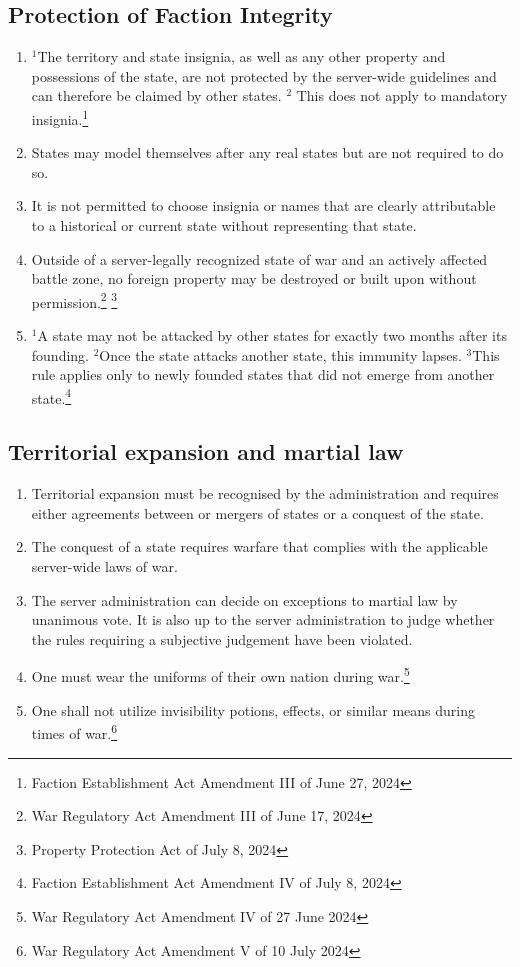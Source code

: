 \documentclass{article}
\begin{document}
\subsection{Protection of Faction Integrity}
\begin{enumerate}[(1)]
	\item ${^1}$The territory and state insignia, as well as any other property and possessions of the state, are not protected by the server-wide guidelines and can therefore be claimed by other states. ${^2}$ This does not apply to mandatory insignia.\footnote{Faction Establishment Act Amendment III of June 27, 2024}
    \item States may model themselves after any real states but are not required to do so.
    \item It is not permitted to choose insignia or names that are clearly attributable to a historical or current state without representing that state.
    \item Outside of a server-legally recognized state of war and an actively affected battle zone, no foreign property may be destroyed or built upon without permission.\footnote{War Regulatory Act Amendment III of June 17, 2024} \footnote{Property Protection Act of July 8, 2024}
	\item ${^1}$A state may not be attacked by other states for exactly two months after its founding. ${^2}$Once the state attacks another state, this immunity lapses. ${^3}$This rule applies only to newly founded states that did not emerge from another state.\footnote{Faction Establishment Act Amendment IV of July 8, 2024}
\end{enumerate}

\subsection{Territorial expansion and martial law}
\begin{enumerate}[(1)]
    \item Territorial expansion must be recognised by the administration and requires either agreements between or mergers of states or a conquest of the state.
    \item The conquest of a state requires warfare that complies with the applicable server-wide laws of war.
    \item The server administration can decide on exceptions to martial law by unanimous vote. It is also up to the server administration to judge whether the rules requiring a subjective judgement have been violated. %
    \item One must wear the uniforms of their own nation during war.\footnote{War Regulatory Act Amendment IV of 27 June 2024}
	\item One shall not utilize invisibility potions, effects, or similar means during times of war.\footnote{War Regulatory Act Amendment V of 10 July 2024}
\end{enumerate}
\end{document}
